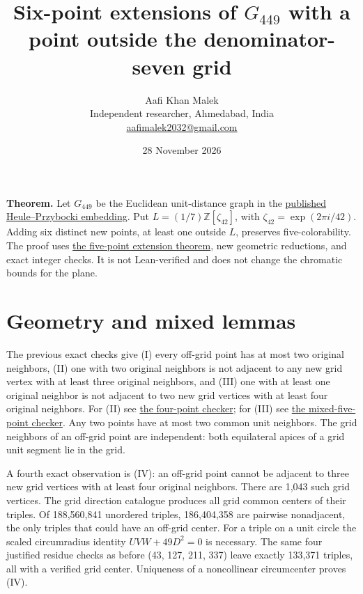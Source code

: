 \documentclass[11pt,letterpaper]{article}
\title{Six-point extensions of \(G_{449}\) with a point outside the denominator-seven grid}
\author{Aafi Khan Malek\\ \small Independent researcher, Ahmedabad, India\\
\small\href{mailto:aafimalek2032@gmail.com}{aafimalek2032@gmail.com}}
\date{28 November 2026}
\begin{document}
\maketitle
\textbf{Theorem.} Let \(G_{449}\) be the Euclidean unit-distance graph in
the \href{https://arxiv.org/abs/2611.28518}{published Heule--Przybocki embedding}. Put
\(L=(1/7)\mathbb Z[\zeta_{42}]\), with \(\zeta_{42}=\exp(2\pi i/42)\).
Adding six distinct new points, at least one outside \(L\), preserves
five-colorability. The proof uses
\href{https://github.com/Aafimalek/novel-discoveries/tree/234e0ce194fdfa544d4b551ccea9898b2239dc69/hadwiger-nelson/verification/g449/prime-seven-catalogue/five-point-extensions}{the five-point extension theorem},
new geometric reductions, and exact integer checks. It is not
Lean-verified and does not change the chromatic bounds for the plane.

\section{Geometry and mixed lemmas}\label{geometry-and-mixed-lemmas}

The previous exact checks give (I) every off-grid point has at most two
original neighbors, (II) one with two original neighbors is not adjacent
to any new grid vertex with at least three original neighbors, and (III)
one with at least one original neighbor is not adjacent to two new grid
vertices with at least four original neighbors. For (II) see
\href{https://github.com/Aafimalek/novel-discoveries/blob/1c624e99b4c05f24b89d26ee941a62d7bd959fc0/hadwiger-nelson/verification/g449/prime-seven-catalogue/four-five-point-extensions/classify_offgrid_four.py}{the
four-point checker}; for (III) see
\href{https://github.com/Aafimalek/novel-discoveries/blob/1c624e99b4c05f24b89d26ee941a62d7bd959fc0/hadwiger-nelson/verification/g449/prime-seven-catalogue/four-five-point-extensions/one_base_high_pair.py}{the
mixed-five-point checker}. Any two points have at most two common unit
neighbors. The grid neighbors of an off-grid point are independent: both
equilateral apices of a grid unit segment lie in the grid.

A fourth exact observation is (IV): an off-grid point cannot be adjacent
to three new grid vertices with at least four original neighbors. There
are 1,043 such grid vertices. The grid direction catalogue produces all
grid common centers of their triples. Of 188,560,841 unordered triples,
186,404,358 are pairwise nonadjacent, the only triples that could have
an off-grid center. For a triple on a unit circle the scaled
circumradius identity \(UVW+49D^2=0\) is necessary. The same four
justified residue checks as before (43, 127, 211, 337) leave exactly
133,371 triples, all with a verified grid center. Uniqueness of a
noncollinear circumcenter proves (IV).
\end{document}
